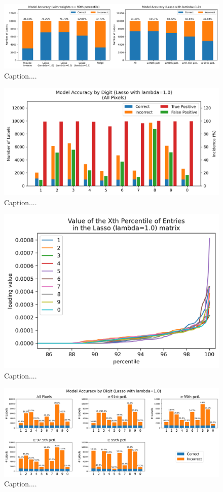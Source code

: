 \documentclass[10pt]{article}
\begin{document}
\begin{figure}[ht]
\centerline{\includegraphics[scale=0.6]{figures/most_important_pixels_90th_accuracy.png}}
\caption{Caption....}
\label{fig20}
\end{figure}

\begin{figure}[ht]
\centerline{\includegraphics[scale=0.85]{figures/DIGIT_ALL_PIXELS_lasso_accuracy_comparison.png}}
\caption{Caption....}
\label{fig21}
\end{figure}

\begin{figure}[ht]
\centerline{\includegraphics[scale=0.9]{figures/DIGIT_lasso_loading_percentiles-see_uptick_at_91.png}}
\caption{Caption....}
\label{fig22}
\end{figure}

\begin{figure}[ht]
\centerline{\includegraphics[scale=0.5]{figures/DIGIT_PCTS_lasso_accuracy_comparison.png}}
\caption{Caption....}
\label{fig23}
\end{figure}
\end{document}
